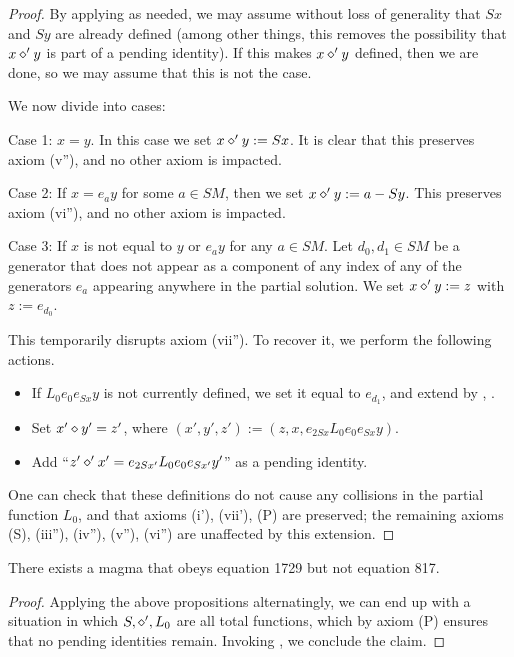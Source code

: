 \begin{proof}  By applying  as needed, we may assume without loss of generality that $Sx$ and $Sy$ are already defined (among other things, this removes the possibility that $x \diamond' y$ is part of a pending identity).  If this makes $x \diamond' y$ defined, then we are done, so we may assume that this is not the case.

We now divide into cases:

Case 1: $x=y$.  In this case we set $x \diamond' y := Sx$.  It is clear that this preserves axiom (v''), and no other axiom is impacted.

Case 2: If $x = e_a y$ for some $a \in SM$, then we set $x \diamond' y := a - Sy$.  This preserves axiom (vi''), and no other axiom is impacted.

Case 3: If $x$ is not equal to $y$ or $e_a y$ for any $a \in SM$.  Let $d_0, d_1 \in SM$ be a generator that does not appear as a component of any index of any of the generators $e_a$ appearing anywhere in the partial solution.  We set $x \diamond' y := z$ with $z := e_{d_0}$.

This temporarily disrupts axiom (vii'').  To recover it, we perform the following actions.
\begin{itemize}
  \item If $L_0 e_0 e_{Sx} y$ is not currently defined, we set it equal to $e_{d_1}$, and extend by , .
  \item Set $x' \diamond y' = z'$, where $(x',y',z') := (z, x, e_{2Sx} L_0 e_0 e_{Sx} y)$.
  \item Add ``$z' \diamond' x' = e_{2Sx'} L_0 e_0 e_{Sx'} y'$'' as a pending identity.
\end{itemize}

One can check that these definitions do not cause any collisions in the partial function $L_0$, and that axioms (i'), (vii'), (P) are preserved; the remaining axioms (S), (iii''), (iv''), (v''), (vi'') are unaffected by this extension.
\end{proof}


\begin{theorem}\label{1729_refute_817} There exists a magma that obeys equation 1729 but not equation 817.
\end{theorem}

\begin{proof}
  Applying the above propositions alternatingly, we can end up with a situation in which $S, \diamond', L_0$ are all total functions, which by axiom (P) ensures that no pending identities remain.  Invoking , we conclude the claim.
\end{proof}
